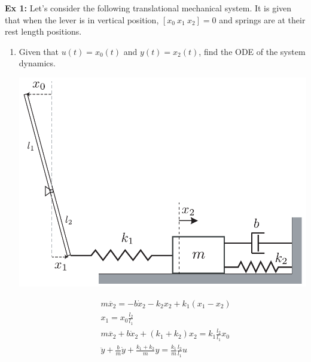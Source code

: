 \documentclass[twoside]{article}
\begin{document}
\textbf{Ex 1:} Let's consider the following translational mechanical system. It is given that when the lever is in vertical position, 
$\left[ x_0 \ x_1 \ x_2 \right] = 0$ and springs are at their rest length positions. 

\begin{enumerate}

\item Given that $u(t) = x_0(t)$ and $y(t) = x_2(t)$,
find the ODE of the system dynamics.

  \begin{minipage}[h]{0.6\linewidth}
    \begin{center}
      \includegraphics[width=1\textwidth]{ex1}
    \end{center}
  \end{minipage}
  \begin{minipage}[h]{0.4\linewidth}
    \begin{center}
 	\begin{align*}
	&m \ddot{x_2} = - b \dot{x}_2 - k_2 x_2 + k_1 (x_1 - x_2)
	\\
	&x_1  = x_0 \frac{l_2}{l_1} 
	\\
	&m \ddot{x_2} + b \dot{x}_2 + (k_1 + k_2) x_2  =  k_1 \frac{l_2}{l_1} x_0
	\\
	&\ddot{y} + \frac{b}{m} \dot{y} + \frac{k_1 + k_2}{m} y  = 
	\frac{k_1}{m} \frac{l_2}{l_1} u
		\end{align*}
    \end{center}
  \end{minipage}
  
  \vspace{6pt}
  

\end{enumerate}
\end{document}
